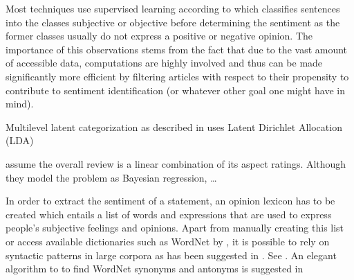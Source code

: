 
Most techniques use supervised learning according to \textcite{Wiebe.1999} which classifies sentences into the classes subjective or objective before determining the sentiment as the former classes usually do not express a positive or negative opinion. The importance of this observations stems from the fact that due to the vast amount of accessible data, computations are highly involved and thus can be made significantly more efficient by filtering articles with respect to their propensity to contribute to sentiment identification (or whatever other goal one might have in mind). 


Multilevel latent categorization as described in \textcite{Guo.2009} uses Latent Dirichlet Allocation (LDA) 


\textcite{Wang.2010} assume the overall review is a linear combination of its aspect ratings. Although they model the problem as Bayesian regression, \dots %

In order to extract the sentiment of a statement, an opinion lexicon has to be created which entails a list of words and expressions that are used to express people's subjective feelings and opinions. Apart from manually creating this list or access available dictionaries such as WordNet\textsuperscript{\textregistered} by \textcite{Fellbaum.1998; Esuli.2006}, it is possible to rely on syntactic patterns in large corpora as has been suggested in \textcite{Ding.2008,Hatzivassiloglou.1997,Kanayama.2006,Turney.2002,Yu.2003}. See \textcite{Feldman.2013}. An elegant algorithm to to find WordNet\textsuperscript{\textregistered} synonyms and antonyms is suggested in \textcite{Kamps.2004} %


